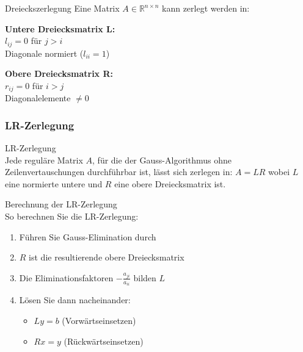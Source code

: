 \begin{definition}{Dreieckszerlegung}
Eine Matrix $A \in \mathbb{R}^{n\times n}$ kann zerlegt werden in:
\vspace{1mm}\\
\begin{minipage}[t]{0.5\textwidth}
    \textbf{Untere Dreiecksmatrix L:}\\
    $l_{ij} = 0$ für $j > i$\\
    Diagonale normiert ($l_{ii}=1$)
\end{minipage}
\hspace{3mm}
\begin{minipage}[t]{0.45\textwidth}
    \textbf{Obere Dreiecksmatrix R:}\\
    $r_{ij} = 0$ für $i > j$\\
    Diagonalelemente $\neq 0$
\end{minipage}
\end{definition}


\subsubsection{LR-Zerlegung}

\begin{theorem}{LR-Zerlegung}\\
Jede reguläre Matrix $A$, für die der Gauss-Algorithmus ohne Zeilenvertauschungen durchführbar ist, lässt sich zerlegen in:
$A = LR$
wobei $L$ eine normierte untere und $R$ eine obere Dreiecksmatrix ist.
\end{theorem}

\begin{KR}{Berechnung der LR-Zerlegung}\\
So berechnen Sie die LR-Zerlegung:
\begin{enumerate}
    \item Führen Sie Gauss-Elimination durch
    \item $R$ ist die resultierende obere Dreiecksmatrix
    \item Die Eliminationsfaktoren $-\frac{a_{ji}}{a_{ii}}$ bilden $L$
    \item Lösen Sie dann nacheinander:
        \begin{itemize}
            \item $Ly = b$ (Vorwärtseinsetzen)
            \item $Rx = y$ (Rückwärtseinsetzen)
        \end{itemize}
\end{enumerate}
\end{KR}

